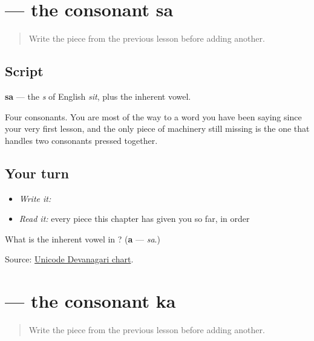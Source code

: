 \section[sa]{ — the consonant sa}

\label{lesson:MR-W01-sa}



\begin{quote}
Write the piece from the previous lesson before adding another.
\end{quote}

\subsection*{Script}
\begin{quote}
\end{quote}

\textbf{sa} — the \emph{s} of English \emph{sit}, plus the inherent vowel.

Four consonants. You are most of the way to a word you have been saying since your very first lesson, and the only piece of machinery still missing is the one that handles two consonants pressed together.

\subsection*{Your turn}
\begin{itemize}
\raggedright
  \item \emph{Write it:} 
  \item \emph{Read it:} every piece this chapter has given you so far, in order
\end{itemize}

\begin{tcolorbox}[breakable,colback=teal!4,colframe=teal!35!black,title={Before you move on}]
What is the inherent vowel in \textbf{}? (\textbf{a} — \emph{sa}.)

Source: \href{https://www.unicode.org/charts/PDF/U0900.pdf}{Unicode Devanagari chart}.
\end{tcolorbox}
\section[ka]{ — the consonant ka}

\label{lesson:MR-W01-ka}



\begin{quote}
Write the piece from the previous lesson before adding another.
\end{quote}

